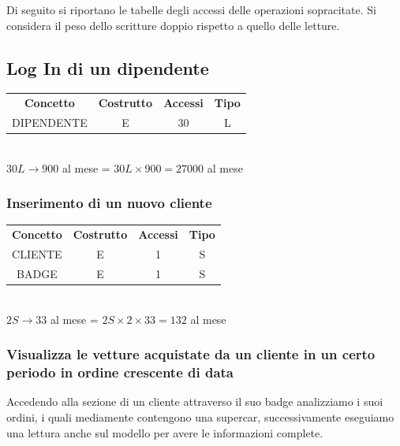 \documentclass[12pt]{article}
\begin{document}
Di seguito si riportano le tabelle degli accessi delle operazioni sopracitate.
Si considera il peso dello scritture doppio rispetto a quello delle letture.

\subsection{Log In di un dipendente}

\begin{table}[H]
    \centering
    \begin{tabular}{ c c c c }
        \rowcolor{red!20!}
        \textbf{Concetto} & \textbf{Costrutto} & \textbf{Accessi} &
        \textbf{Tipo}\\
        DIPENDENTE & E & 30 & L \\
    \end{tabular}\\
    \( 30L \rightarrow 900 \) al mese = \( 30L \times 900 =  27000\) al mese
\end{table}


\subsubsection{Inserimento di un nuovo cliente}

\begin{table}[H]
    \centering
    \begin{tabular}{ c c c c }
        \rowcolor{red!20!}
        \textbf{Concetto} & \textbf{Costrutto} & \textbf{Accessi} &
        \textbf{Tipo}\\
        CLIENTE & E & 1 & S \\
        BADGE & E & 1 & S \\
    \end{tabular}\\
    \( 2S \rightarrow 33 \) al mese = \( 2S \times 2 \times 33 = 132 \) al mese
\end{table}

\subsubsection{Visualizza le vetture acquistate da un cliente in un certo periodo in
ordine crescente di data}

Accedendo alla sezione di un cliente attraverso il suo badge analizziamo i suoi
ordini, i quali mediamente contengono una supercar, successivamente eseguiamo
una lettura anche sul modello per avere le informazioni complete.
\end{document}
